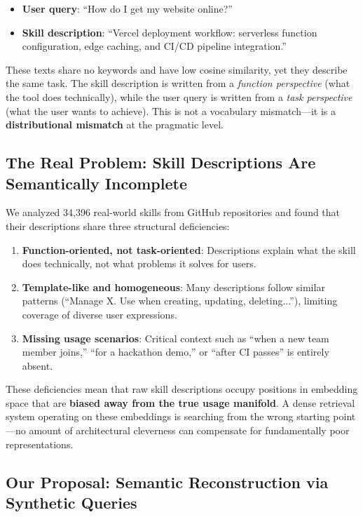 \documentclass[11pt,a4paper]{article}
\begin{document}
\begin{itemize}
  \item \textbf{User query}: ``How do I get my website online?''
  \item \textbf{Skill description}: ``Vercel deployment workflow: serverless function configuration, edge caching, and CI/CD pipeline integration.''
\end{itemize}

These texts share no keywords and have low cosine similarity, yet they describe the same task. The skill description is written from a \emph{function perspective} (what the tool does technically), while the user query is written from a \emph{task perspective} (what the user wants to achieve). This is not a vocabulary mismatch---it is a \textbf{distributional mismatch} at the pragmatic level.

\subsection{The Real Problem: Skill Descriptions Are Semantically Incomplete}

We analyzed 34,396 real-world skills from GitHub repositories \citep{ucsb2026} and found that their descriptions share three structural deficiencies:

\begin{enumerate}
  \item \textbf{Function-oriented, not task-oriented}: Descriptions explain what the skill does technically, not what problems it solves for users.
  \item \textbf{Template-like and homogeneous}: Many descriptions follow similar patterns (``Manage X. Use when creating, updating, deleting...''), limiting coverage of diverse user expressions.
  \item \textbf{Missing usage scenarios}: Critical context such as ``when a new team member joins,'' ``for a hackathon demo,'' or ``after CI passes'' is entirely absent.
\end{enumerate}

These deficiencies mean that raw skill descriptions occupy positions in embedding space that are \textbf{biased away from the true usage manifold}. A dense retrieval system operating on these embeddings is searching from the wrong starting point---no amount of architectural cleverness can compensate for fundamentally poor representations.

\subsection{Our Proposal: Semantic Reconstruction via Synthetic Queries}
\end{document}
